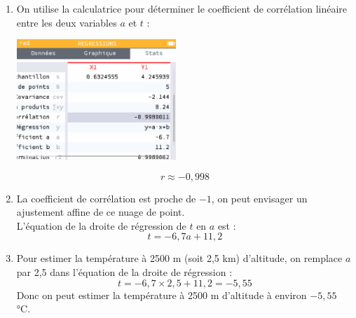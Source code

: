 \documentclass[a4paper,11pt,exos]{nsi}
\begin{document}
\textcolor{UGLiBlue}{
    \begin{enumerate}
        \item On utilise la calculatrice pour déterminer le coefficient de corrélation linéaire entre les deux variables $a$ et $t$ :
        \begin{center}
            \includegraphics[width=6cm]{corr_stat.png}
        \end{center}
        $$r \approx -0{,}998$$
        \item La coefficient de corrélation est proche de $-1$, on peut envisager un ajustement affine de ce nuage de point.\\
        L'équation de la droite de régression de $t$ en $a$ est :
        $$t = -6,7a + 11,2$$
        \item Pour estimer la température à 2500 m (soit 2,5 km) d'altitude, on remplace $a$ par 2,5 dans l'équation de la droite de régression :
        $$t = -6,7\times 2{,}5 + 11,2 = -5{,}55$$
        Donc on peut estimer la température à 2500 m d'altitude à environ $-5{,}55$ °C.
    \end{enumerate}
}
\end{document}
